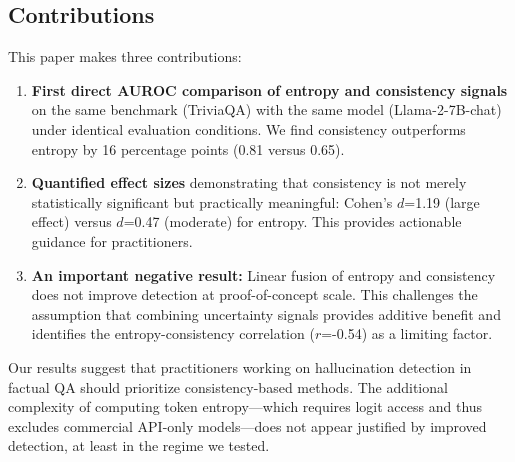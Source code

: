 \subsection{Contributions}

This paper makes three contributions:

\begin{enumerate}
    \item \textbf{First direct AUROC comparison of entropy and consistency signals} on the same benchmark (TriviaQA) with the same model (Llama-2-7B-chat) under identical evaluation conditions. We find consistency outperforms entropy by 16 percentage points (0.81 versus 0.65).

    \item \textbf{Quantified effect sizes} demonstrating that consistency is not merely statistically significant but practically meaningful: Cohen's $d$=1.19 (large effect) versus $d$=0.47 (moderate) for entropy. This provides actionable guidance for practitioners.

    \item \textbf{An important negative result:} Linear fusion of entropy and consistency does not improve detection at proof-of-concept scale. This challenges the assumption that combining uncertainty signals provides additive benefit and identifies the entropy-consistency correlation ($r$=-0.54) as a limiting factor.
\end{enumerate}

Our results suggest that practitioners working on hallucination detection in factual QA should prioritize consistency-based methods. The additional complexity of computing token entropy---which requires logit access and thus excludes commercial API-only models---does not appear justified by improved detection, at least in the regime we tested.
